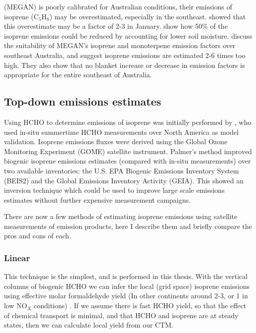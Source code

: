     (MEGAN) is poorly calibrated for Australian conditions, their emissions of isoprene (C$_5$H$_8$) may be overestimated, especially in the southeast.
    \textcite{Stavrakou2015} showed that this overestimate may be a factor of 2-3 in January.
    \textcite{Sindelarova2014} show how 50\% of the isoprene emissions could be reduced by accounting for lower soil moisture.
    \textcite{Emmerson2016} discuss the suitability of MEGAN's isoprene and monoterpene emission factors over southeast Australia, and suggest isoprene emissions are estimated 2-6 times too high.
    They also show that no blanket increase or decrease in emission factors is appropriate for the entire southeast of Australia.
  
  \subsection{Top-down emissions estimates}
    
    Using HCHO to determine emissions of isoprene was initially performed by \textcite{Palmer2001, Palmer2003}, who used in-situ summertime HCHO measurements over North America as model validation.
    Isoprene emissions fluxes were derived using the Global Ozone Monitoring Experiment (GOME) satellite instrument.
    Palmer's method improved biogenic isoprene emissions estimates (compared with in-situ measurements) over two available inventories: the U.S. EPA Biogenic Emissions Inventory System (BEIS2) and the Global Emissions Inventory Activity (GEIA).
    This showed an inversion technique which could be used to improve large scale emissions estimates without further expensive measurement campaigns.

    There are now a few methods of estimating isoprene emissions using satellite measurements of emission products, here I describe them and briefly compare the pros and cons of each.
    
    \subsubsection{Linear}
      \label{BioIsop:intro:top_down_linear}
      
      This technique is the simplest, and is performed in this thesis.
      With the vertical columns of biogenic HCHO we can infer the local (grid space) isoprene emissions using effective molar formaldehyde yield (In other continents around 2-3, or 1 in low NO$_X$ conditions) \parencite{Palmer2003,Marais2012,Bauwens2016}.
      If we assume there is fast HCHO yield, so that the effect of chemical transport is minimal, and that HCHO and isoprene are at steady states, then we can calculate local yield from our CTM.
      
